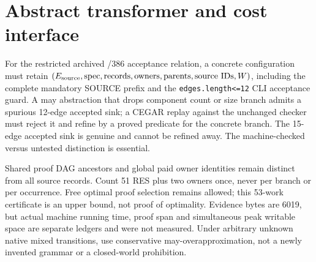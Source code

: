\documentclass[11pt]{article}
\begin{document}
\section{Abstract transformer and cost interface}
For the restricted archived /386 acceptance relation, a concrete configuration must retain $(E_{\rm source},\mathrm{spec},\mathrm{records},\mathrm{owners},\mathrm{parents},\mathrm{source\ IDs},W)$, including the complete mandatory SOURCE prefix and the \texttt{edges.length<=12} CLI acceptance guard. A may abstraction that drops component count or size branch admits a spurious 12-edge accepted sink; a CEGAR replay against the unchanged checker must reject it and refine by a proved predicate for the concrete branch. The 15-edge accepted sink is genuine and cannot be refined away. The machine-checked versus untested distinction is essential.
\par
Shared proof DAG ancestors and global paid owner identities remain distinct from all source records. Count 51 RES plus two owners once, never per branch or per occurrence. Free optimal proof selection remains allowed; this 53-work certificate is an upper bound, not proof of optimality. Evidence bytes are 6019, but actual machine running time, proof span and simultaneous peak writable space are separate ledgers and were not measured. Under arbitrary unknown native mixed transitions, use conservative may-overapproximation, not a newly invented grammar or a closed-world prohibition.
\end{document}
